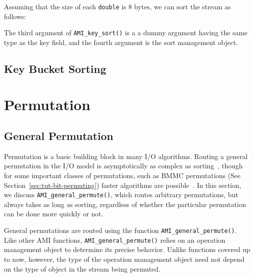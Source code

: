 
 
Assuming that the size of each \lstinline|double| is 8 bytes,
we can sort the stream as follows:
 

 
The third argument of \lstinline|AMI_key_sort()| is a a
dummy argument having the same type as the key field, and
the fourth argument is the sort management
object.




\subsection{Key Bucket Sorting}


\tobewritten


\section{Permutation}

\subsection{General Permutation}

Permutation is a basic building block in many I/O
algorithms. Routing a general permutation in the I/O model
is asymptotically as complex as
sorting~\cite{aggarwal:input}, though for some important
classes of permutations, such as BMMC permutations (See
Section~\ref{sec:tut-bit-permuting}) faster algorithms are
possible~\cite{cormen:fast}. In this section, we discuss
\lstinline|AMI_general_permute()|, which routes arbitrary
permutations, but always takes as long as sorting,
regardless of whether the particular permutation can be done
more quickly or not.

General permutations are routed using the function
\lstinline|AMI_general_permute()|.  Like other AMI functions,
\lstinline|AMI_general_permute()| relies on an operation management
object to determine its precise
behavior.  Unlike functions covered up to now, however, the type of
the operation management object
need not depend on the type of object in the stream being permuted.

